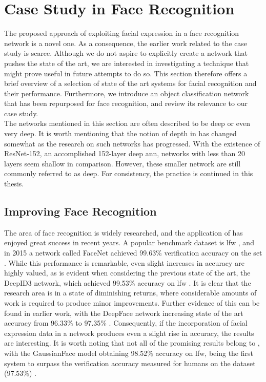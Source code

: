 \section{Case Study in Face Recognition}

The proposed approach of exploiting facial expression in a face recognition network is a novel one. As a consequence, the earlier work related to the case study is scarce. Although we do not aspire to explicitly create a network that pushes the state of the art, we are interested in investigating a technique that might prove useful in future attempts to do so. This section therefore offers a brief overview of a selection of state of the art systems for facial recognition and their performance. Furthermore, we introduce an object classification network that has been repurposed for face recognition, and review its relevance to our case study. \\

\noindent The networks mentioned in this section are often described to be deep or even very deep. It is worth mentioning that the notion of depth in  has changed somewhat as the research on such networks has progressed. With the existence of ResNet-152, an accomplished 152-layer deep \acrshort{ann}, networks with less than 20 layers seem shallow in comparison. However, these smaller network are still commonly referred to as deep. For consistency, the practice is continued in this thesis. 

\subsection{Improving Face Recognition} \label{sec:improving-face-recognition}

The area of face recognition is widely researched, and the application of  has enjoyed great success in recent years. A popular benchmark dataset is \acrfull{lfw} \cite{lfw}, and in 2015 a network called FaceNet achieved 99.63\% verification accuracy on the set \cite{facenet}. While this performance is remarkable, even slight increases in accuracy are highly valued, as is evident when considering the previous state of the art, the DeepID3 network, which achieved 99.53\% accuracy on \acrshort{lfw} \cite{deepid3}. It is clear that the research area is in a state of diminishing returns, where considerable amounts of work is required to produce minor improvements. Further evidence of this can be found in earlier work, with the DeepFace network increasing state of the art accuracy from 96.33\% to 97.35\% \cite{deepface}. Consequently, if the incorporation of facial expression data in a network produces even a slight rise in accuracy, the results are interesting. It is worth noting that not all of the promising results belong to , with the GaussianFace model obtaining 98.52\% accuracy on \acrshort{lfw}, being the first system to surpass the verification accuracy measured for humans on the dataset (97.53\%) \cite{gaussianface}.

